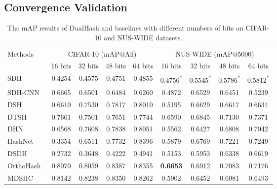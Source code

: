 \subsection{Convergence Validation}
\label{Subsection: Convergence validation and performance efficiency analysis}
\begin{table}[!tbp]
    \centering
    \caption{The mAP results of DualHash and baselines with different numbers of bits on CIFAR-10 and NUS-WIDE datasets.}
    \label{Table: baselines mAP}
    \small
    \setlength{\tabcolsep}{3pt}
    \begin{tabular*}{\linewidth}{@{\extracolsep{\fill}}lcccccccc@{}}
        \toprule
        \multirow{2}{*}{Methods} & \multicolumn{4}{c}{CIFAR-10 (mAP@All)} & \multicolumn{4}{c}{NUS-WIDE (mAP@5000)} \\
        \cmidrule(lr){2-5} \cmidrule(lr){6-9}
         & 16 bits & 32 bits & 48 bits & 64 bits & 16 bits & 32 bits & 48 bits & 64 bits \\
        \midrule
        SDH~\cite{shenSupervisedDiscreteHashing2015} & 0.4254 & 0.4575 & 0.4751 & 0.4855 & 0.4756\textsuperscript{*} & 0.5545\textsuperscript{*} & 0.5786\textsuperscript{*} & 0.5812\textsuperscript{*} \\
        SDH-CNN & 0.6665 & 0.6501 & 0.6484 & 0.6260 & 0.4872 & 0.6529 & 0.6451 & 0.5239 \\
        DSH~\cite{liuDeepSupervisedHashing} & 0.6610 & 0.7530 & 0.7817 & 0.8010 & 0.5195 & 0.6629 & 0.6617 & 0.6634 \\
        DTSH~\cite{wang2016DTSH}  & 0.7661 & 0.7501 & 0.7651 & 0.7744 & 0.6590 & 0.6845 & 0.7130 & 0.7371 \\ 
        DHN~\cite{zhuDeepHashingNetwork2016} & 0.6568 & 0.7608 & 0.7838 & 0.8051 & 0.5562 & 0.6427 & 0.6808 & 0.7042 \\
        HashNet~\cite{Cao2017HashNetDL} & 0.3354 & 0.6511 & 0.7732 & 0.8396 & 0.5879 & 0.6769 & 0.7221 & 0.7249 \\
        DSDH~\cite{li2017deep} & 0.2732 & 0.3648 & 0.4222 & 0.4941 & 0.5153 & 0.5953 & 0.6338 & 0.6619 \\
        OrthoHash~\cite{hoeOneLossAll2021} & 0.8070 & 0.8059 & 0.8387 & 0.8355 & \textbf{0.6653} & 0.6912 & 0.7083 & 0.7176 \\
        MDSHC~\cite{wang2023deep} & 0.8142 & 0.8238 & 0.8350 & 0.8262 & 0.5902 & 0.6452 & 0.6081 & 0.6493 \\

\end{tabular*}
\end{table}

